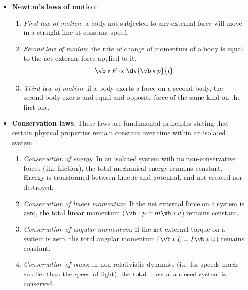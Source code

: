 \begin{itemize}
	\item \textbf{Newton's laws of motion}:
	\begin{enumerate}
		\item \textit{First law of motion}: a body not subjected to any external force will move in a straight line at constant speed.
		
		\item \textit{Second law of motion}: the rate of change of momentum of a body is equal to the net external force applied to it.
		\begin{align*}
			\vb*{F}\propto\dv{\vb*{p}}{t}
		\end{align*}
		
		\item \textit{Third law of motion}: if a body exerts a force on a second body, the second body exerts and equal and opposite force of the same kind on the first one.
	\end{enumerate}
	
	\item \textbf{Conservation laws}: These laws are fundamental principles stating that certain physical properties remain constant over time within an isolated system.
	\begin{enumerate}
		\item \textit{Conservation of energy}:  In an isolated system with no non-conservative forces (like friction), the total mechanical energy remains constant. Energy is transformed between kinetic and potential, and not created nor destroyed.
		
		\item \textit{Conservation of linear momentum}: If the net external force on a system is zero, the total linear momentum ($\vb*{p}=m\vb*{v}$) remains constant.
		
		\item \textit{Conservation of angular momentum}:  If the net external torque on a system is zero, the total angular momentum ($\vb*{L}=I\vb*{\omega}$) remains constant.
		
		\item \textit{Conservation of mass}: In non-relativistic dynamics (i.e. for speeds much smaller than the speed of light), the total mass of a closed system is conserved.
	\end{enumerate}
\end{itemize}